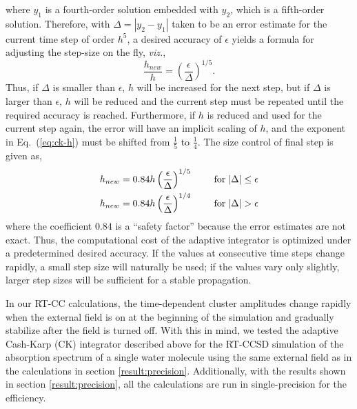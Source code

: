 where $y_{1}$ is a fourth-order solution embedded with $y_{2}$, which is a
fifth-order solution. Therefore, with $\Delta=|y_{2}-y_{1}|$ taken to be an
error estimate for the current time step of order $h^{5}$, a desired accuracy of
$\epsilon$ yields a formula for adjusting the step-size on the fly,
\textit{viz.},
\begin{equation}\label{eq:ck-h}
\frac{h_{new}}{h}=\left(\frac{\epsilon}{\Delta}\right)^{1/5}.
\end{equation}
Thus, if $\Delta$ is smaller than $\epsilon$, $h$ will be increased for the next
step, but if $\Delta$ is larger than $\epsilon$, $h$ will be reduced and the
current step must be repeated until the required accuracy is reached.
Furthermore, if $h$ is reduced and used for the current step again, the error
will have an implicit scaling of $h$, and the exponent in Eq.~(\ref{eq:ck-h})
must be shifted from $\frac{1}{5}$ to $\frac{1}{4}$. The size control of final
step is given as,
\begin{equation}\label{eq:ck-h-final}
\begin{aligned}
h_{new} &= 0.84 h \left(\frac{\epsilon}{\Delta}\right)^{1/5}   \hspace{0.5cm}&
\textrm{for} \hspace{0.1cm}|\Delta| \leq \epsilon \\
h_{new} &= 0.84 h \left(\frac{\epsilon}{\Delta}\right)^{1/4}   \hspace{0.5cm}& 
\textrm{for} \hspace{0.1cm}|\Delta| > \epsilon 
\end{aligned}
\end{equation}
where the coefficient $0.84$ is a ``safety factor'' because the error
estimates are not exact.  Thus, the computational cost of the adaptive
integrator is optimized under a predetermined desired accuracy. If the values at
consecutive time steps change rapidly, a small step size will naturally be used;
if the values vary only slightly, larger step sizes will be sufficient for a
stable propagation. 

In our RT-CC calculations, the time-dependent cluster amplitudes change rapidly
when the external field is on at the beginning of the simulation and gradually
stabilize after the field is turned off.  With this in mind, we tested the
adaptive Cash-Karp (CK) integrator described above for the RT-CCSD simulation
of the absorption spectrum of a single water molecule using the same external
field as in the calculations in section \ref{result:precision}. Additionally,
with the results shown in section \ref{result:precision}, all the calculations
are run in single-precision for the efficiency. 

